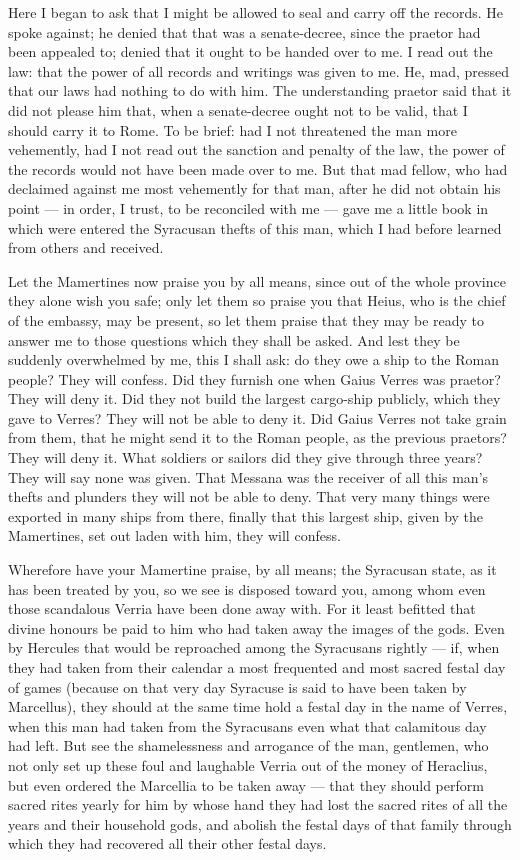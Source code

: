  Here I began to ask that I might be allowed to seal and carry off the records. He spoke against; he denied that that was a senate-decree, since the praetor had been appealed to; denied that it ought to be handed over to me. I read out the law: that the power of all records and writings was given to me. He, mad, pressed that our laws had nothing to do with him. The understanding praetor said that it did not please him that, when a senate-decree ought not to be valid, that I should carry it to Rome. To be brief: had I not threatened the man more vehemently, had I not read out the sanction and penalty of the law, the power of the records would not have been made over to me. But that mad fellow, who had declaimed against me most vehemently for that man, after he did not obtain his point --- in order, I trust, to be reconciled with me --- gave me a little book in which were entered the Syracusan thefts of this man, which I had before learned from others and received.

 Let the Mamertines now praise you by all means, since out of the whole province they alone wish you safe; only let them so praise you that Heius, who is the chief of the embassy, may be present, so let them praise that they may be ready to answer me to those questions which they shall be asked. And lest they be suddenly overwhelmed by me, this I shall ask: do they owe a ship to the Roman people? They will confess. Did they furnish one when Gaius Verres was praetor? They will deny it. Did they not build the largest cargo-ship publicly, which they gave to Verres? They will not be able to deny it. Did Gaius Verres not take grain from them, that he might send it to the Roman people, as the previous praetors? They will deny it. What soldiers or sailors did they give through three years? They will say none was given. That Messana was the receiver of all this man's thefts and plunders they will not be able to deny. That very many things were exported in many ships from there, finally that this largest ship, given by the Mamertines, set out laden with him, they will confess.

 Wherefore have your Mamertine praise, by all means; the Syracusan state, as it has been treated by you, so we see is disposed toward you, among whom even those scandalous Verria have been done away with. For it least befitted that divine honours be paid to him who had taken away the images of the gods. Even by Hercules that would be reproached among the Syracusans rightly --- if, when they had taken from their calendar a most frequented and most sacred festal day of games (because on that very day Syracuse is said to have been taken by Marcellus), they should at the same time hold a festal day in the name of Verres, when this man had taken from the Syracusans even what that calamitous day had left. But see the shamelessness and arrogance of the man, gentlemen, who not only set up these foul and laughable Verria out of the money of Heraclius, but even ordered the Marcellia to be taken away --- that they should perform sacred rites yearly for him by whose hand they had lost the sacred rites of all the years and their household gods, and abolish the festal days of that family through which they had recovered all their other festal days.

